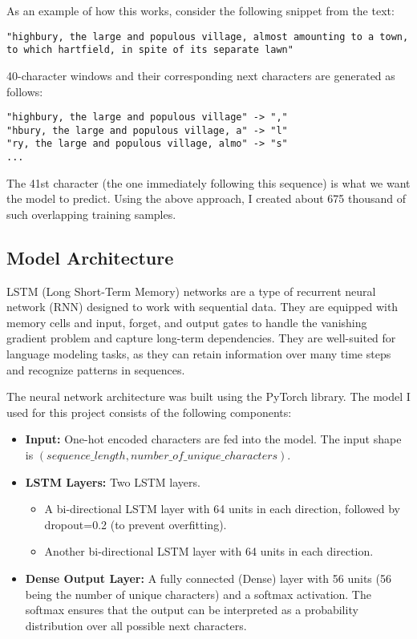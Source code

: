 \documentclass{article}
\begin{document}
As an example of how this works, consider the following snippet from the text:

\begin{lstlisting}
"highbury, the large and populous village, almost amounting to a town,
to which hartfield, in spite of its separate lawn"
\end{lstlisting}

40-character windows and their corresponding next characters are generated as follows:
\begin{lstlisting}
"highbury, the large and populous village" -> ","
"hbury, the large and populous village, a" -> "l"
"ry, the large and populous village, almo" -> "s"
...
\end{lstlisting}

The 41st character (the one immediately following this sequence) is what we want the model to predict. Using the above approach, I created about 675 thousand of such overlapping training samples.

\subsection{Model Architecture}

LSTM (Long Short-Term Memory) networks are a type of recurrent neural network (RNN) designed to work with sequential data. They are equipped with memory cells and input, forget, and output gates to handle the vanishing gradient problem and capture long-term dependencies. They are well-suited for language modeling tasks, as they can retain information over many time steps and recognize patterns in sequences.

The neural network architecture was built using the PyTorch library. The model I used for this project consists of the following components:

\begin{itemize}
    \item \textbf{Input:} One-hot encoded characters are fed into the model. The input shape is \((sequence\_length, number\_of\_unique\_characters)\).
    \item \textbf{LSTM Layers:} Two LSTM layers.
    \begin{itemize}
        \item A bi-directional LSTM layer with 64 units in each direction, followed by dropout=0.2 (to prevent overfitting).
        \item Another bi-directional LSTM layer with 64 units in each direction.
    \end{itemize}
    \item \textbf{Dense Output Layer:} A fully connected (Dense) layer with 56 units (56 being the number of unique characters) and a softmax activation. The softmax ensures that the output can be interpreted as a probability distribution over all possible next characters.
\end{itemize}
\end{document}
